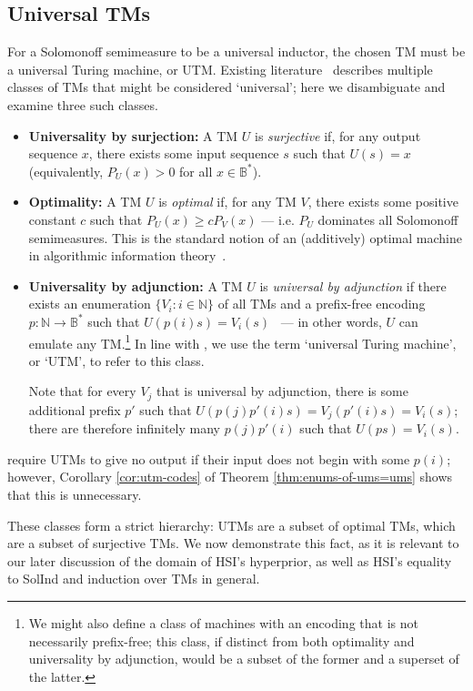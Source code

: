\documentclass[11pt]{article}
\begin{document}
\subsection{Universal TMs}
For a Solomonoff semimeasure to be a universal inductor, the chosen TM must be a universal Turing machine, or UTM.
Existing literature~\citep{Wood2013, LiVitanyi2019} describes multiple classes of TMs that might be considered `universal'; here we disambiguate and examine three such classes.

\begin{itemize}
    \item \textbf{Universality by surjection:} A TM $U$ is \textit{surjective} if, for any output sequence $x$, there exists some input sequence $s$ such that $U(s)=x$ (equivalently, $P_U(x)>0$ for all $x\in\mathbb{B}^*$).
    \item \textbf{Optimality:} A TM $U$ is \textit{optimal} if, for any TM $V$, there exists some positive constant $c$ such that $P_U(x)\geq cP_V(x)$ --- i.e. $P_U$ dominates all Solomonoff semimeasures. This is the standard notion of an (additively) optimal machine in algorithmic information theory~\citep{LiVitanyi2019, DowneyHirschfeldt2010}.
    \item \textbf{Universality by adjunction:} A TM $U$ is \textit{universal by adjunction} if there exists an enumeration $\{V_i:i\in\mathbb{N}\}$ of all TMs and a prefix-free encoding $p:\mathbb{N}\to\mathbb{B}^*$ such that $U(p(i)s)=V_i(s)$~\citep{FigueiraStephanWu2006, DowneyHirschfeldt2010} --- in other words, $U$ can emulate any TM.\footnote{We might also define a class of machines with an encoding that is not necessarily prefix-free; this class, if distinct from both optimality and universality by adjunction, would be a subset of the former and a superset of the latter.}
    In line with \citet{Wood2013}, we use the term `universal Turing machine', or `UTM', to refer to this class.

    Note that for every $V_j$ that is universal by adjunction, there is some additional prefix $p'$ such that $U(p(j)p'(i)s)=V_j(p'(i)s)=V_i(s)$; there are therefore infinitely many $p(j)p'(i)$ such that $U(ps)=V_i(s)$.
\end{itemize}
\citeauthor{Wood2013} require UTMs to give no output if their input does not begin with some $p(i)$; however, Corollary \ref{cor:utm-codes} of Theorem \ref{thm:enums-of-ums=ums} shows that this is unnecessary.

These classes form a strict hierarchy: UTMs are a subset of optimal TMs, which are a subset of surjective TMs.
We now demonstrate this fact, as it is relevant to our later discussion of the domain of HSI's hyperprior, as well as HSI's equality to SolInd and induction over TMs in general.
\end{document}
